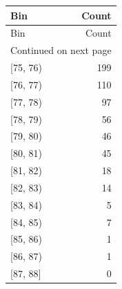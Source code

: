 \begin{longtable}{lr}
\toprule
Bin & Count \\
\midrule
\endfirsthead
\toprule
Bin & Count \\
\midrule
\endhead
\midrule
\multicolumn{2}{r}{Continued on next page} \\
\midrule
\endfoot
\bottomrule
\endlastfoot
{[75, 76)} & 199 \\
{[76, 77)} & 110 \\
{[77, 78)} & 97 \\
{[78, 79)} & 56 \\
{[79, 80)} & 46 \\
{[80, 81)} & 45 \\
{[81, 82)} & 18 \\
{[82, 83)} & 14 \\
{[83, 84)} & 5 \\
{[84, 85)} & 7 \\
{[85, 86)} & 1 \\
{[86, 87)} & 1 \\
{[87, 88]} & 0 \\
\end{longtable}

